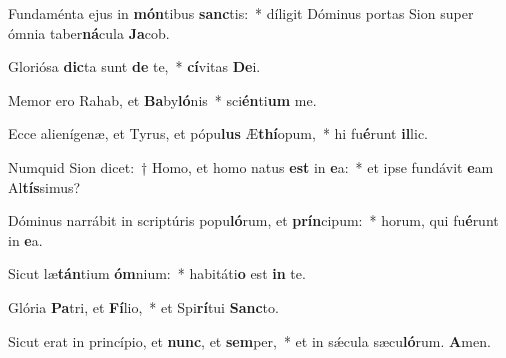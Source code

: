 \item Fundaménta ejus in \textbf{món}tibus \textbf{sanc}tis:~* díligit Dóminus portas Sion super ómnia taber\textbf{ná}cula \textbf{Ja}cob.

\item Gloriósa \textbf{dic}ta sunt \textbf{de} te,~* \textbf{cí}vitas \textbf{De}i.

\item Memor ero Rahab, et \textbf{Ba}by\textbf{ló}nis~* sci\textbf{én}ti\textbf{um} me.

\item Ecce alienígenæ, et Tyrus, et pópu\textbf{lus} Æ\textbf{thí}opum,~* hi fu\textbf{é}runt \textbf{il}lic.

\item Numquid Sion dicet:~† Homo, et homo natus \textbf{est} in \textbf{e}a:~* et ipse fundávit \textbf{e}am Al\textbf{tís}simus?

\item Dóminus narrábit in scriptúris popu\textbf{ló}rum, et \textbf{prín}cipum:~* horum, qui fu\textbf{é}runt in \textbf{e}a.

\item Sicut læ\textbf{tán}tium \textbf{óm}nium:~* habitáti\textbf{o} est \textbf{in} te.

\item Glória \textbf{Pa}tri, et \textbf{Fí}lio,~* et Spi\textbf{rí}tui \textbf{Sanc}to.

\item Sicut erat in princípio, et \textbf{nunc}, et \textbf{sem}per,~* et in sǽcula sæcu\textbf{ló}rum. \textbf{A}men.
